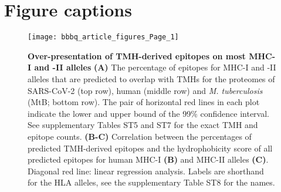 \documentclass[utf8]{frontiersSCNS} %
\begin{document}

\section*{Figure captions}


%
%
\begin{figure}[h!]
\begin{center}
\texttt{[image: bbbq\_article\_figures\_Page\_1]}%
\end{center}
\caption{
    \textbf{Over-presentation of TMH-derived epitopes on most MHC-I and -II alleles}
    \textbf{(A)} 
    The percentage of epitopes for MHC-I and -II alleles that are predicted to 
    overlap with TMHs for the proteomes of SARS-CoV-2 (top row), human (middle 
    row) and \emph{M. tuberculosis} (MtB; bottom row).
    The pair of horizontal red lines in each plot indicate the lower and upper bound 
    of the 99\% confidence interval.
    See supplementary Tables ST5 and ST7
    for the exact TMH and  epitope counts.
    \textbf{(B-C)}
    Correlation between the percentages of predicted TMH-derived epitopes
    and the hydrophobicity score of all predicted epitopes for 
    human MHC-I \textbf{(B)} and MHC-II alleles \textbf{(C)}.
    Diagonal red line: linear regression analysis. 
    Labels are shorthand for the HLA alleles,
    see the supplementary Table ST8 for the names.}
  \label{fig:1}
\end{figure}
\end{document}
